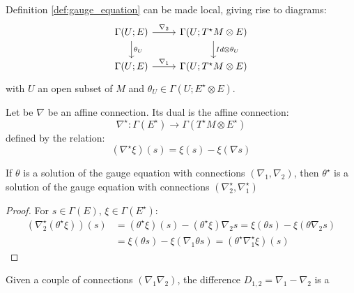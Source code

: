  Definition \ref{def:gauge_equation} can be made local, giving rise
 to diagrams:
 \begin{equation}
     \label{eq:eq_local_gauge_diagram}
     \begin{tikzcd}
     \Gamma\left(U; E \right) \ar[r, "\nabla_2"] \ar[d,"\theta_U"] & \Gamma\left( U; T^\star M \otimes E\right) \ar[d,"Id \otimes \theta_U"] \\
      \Gamma\left(U; E \right) \ar[r,"\nabla_1"] & \Gamma\left( U; T^\star M \otimes E\right)
     \end{tikzcd}
 \end{equation}
 with $U$ an open subset of $M$ and $\theta_U \in \Gamma \left(
 U; E^\star \otimes E 
 \right).$
 \begin{defn}
 \label{def:dual_connection}
 Let be $\nabla$ be an affine connection. Its dual is the affine connection:
 \begin{equation}
     \label{eq:dual_connection}
     \nabla^\star \colon  \Gamma(E^\star) \to \Gamma\left( T^\star M \otimes E^\star \right)
 \end{equation}
 defined by the relation:
 \begin{equation}
     \label{eq:nabla_duality_relation}
     \left( \nabla^\star \xi \right)\left(s\right) = 
     \xi(s) - \xi\left(\nabla s\right)
 \end{equation}
 \end{defn}
 \begin{prop}
 \label{prop:dual_gauge}
 If $\theta$ is a solution of the gauge equation with connections $\left(\nabla_1, \nabla_2\right)$, then 
 $\theta^\star$ is a solution of the gauge equation with connections $\left(\nabla_2^\star, \nabla_1^\star\right)$
 \end{prop}
 \begin{proof}
 For $s \in \Gamma(E), \, \xi \in \Gamma(E^\star)$:
 \begin{align}
     \left(\nabla_2^\star (\theta^\star \xi)\right)\left(
     s\right) & = \left(\theta^\star \xi\right)(s) - 
     \left(\theta^\star \xi\right)\nabla_2 s 
     = \xi \left( \theta s \right) - \xi \left( \theta \nabla_2 s \right) \\
     & = \xi \left( \theta s \right) - \xi \left( \nabla_1 
     \theta s \right) 
      = \left(\theta^\star \nabla_1^\star \xi \right)(s)
 \end{align}
 \end{proof}
 Given a couple of connections $\left(\nabla_1 \nabla_2\right)$, the difference $D_{1,2} = \nabla_1 - \nabla_2$ is a 
 